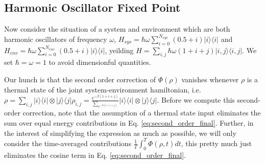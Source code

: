 \documentclass{article}
\newcommand{\ketbra}[2]{| #1\rangle\! \langle #2|}
\begin{document}
\subsection{Harmonic Oscillator Fixed Point}
Now consider the situation of a system and environment which are both harmonic oscillators of frequency $\omega$, $H_{sys} = \hbar \omega \sum_{i=0}^{N_{sys}} (0.5 + i) \ketbra{i}{i}$ and $H_{env} = \hbar \omega \sum_{i=0}^{N_{env}} (0.5 + i) \ketbra{i}{i}$, yeilding $H = \sum_{i,j} \hbar \omega (1 + i + j) \ketbra{i,j}{i,j}$. We set $\hbar = \omega = 1$ to avoid dimensionful quantities. 

Our hunch is that the second order correction of $\Phi(\rho)$ vanishes whenever $\rho$ is a thermal state of the joint system-environment hamiltonian, i.e. $\rho = \sum_{i,j} \ketbra{i}{i} \otimes \ketbra{j}{j}\rho_{i,j} = \frac{e^{-\beta (1 + i + j)}}{\sum_{e^{-\beta(1+  i + j)}}} \ketbra{i}{i} \otimes \ketbra{j}{j}$. Before we compute this second-order correction, note that the assumption of a thermal state input eliminates the sum over equal energy contributions in Eq. \eqref{eq:second_order_final}. Further, in the interest of simplifying the expression as much as possible, we will only consider the time-averaged contributions $\frac{1}{T} \int_0^T \Phi(\rho, t) dt$, this pretty much just eliminates the cosine term in Eq. \eqref{eq:second_order_final}.
\end{document}
